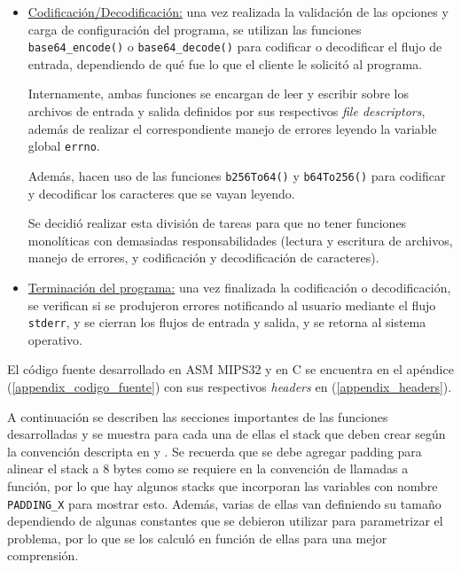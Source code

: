 \begin{itemize}
	\item \underline{Codificación/Decodificación:} una vez realizada la validación de las opciones y carga de configuración del programa, se utilizan las funciones \texttt{base64\_encode()} o \texttt{base64\_decode()} para codificar o decodificar el flujo de entrada, dependiendo de qué fue lo que el cliente le solicitó al programa.
	
	Internamente, ambas funciones se encargan de leer y escribir sobre los archivos de entrada y salida definidos por sus respectivos \emph{file descriptors}, además de realizar el correspondiente manejo de errores leyendo la variable global \texttt{errno}.
	
	Además, hacen uso de las funciones \texttt{b256To64()} y \texttt{b64To256()} para codificar y decodificar los caracteres que se vayan leyendo.
	
	Se decidió realizar esta división de tareas para que no tener funciones monolíticas con demasiadas responsabilidades (lectura y escritura de archivos, manejo de errores, y codificación y decodificación de caracteres).
	
	\item \underline{Terminación del programa:} una vez finalizada la codificación o decodificación, se verifican si se produjeron errores notificando al usuario mediante el flujo \texttt{stderr}, y se cierran los flujos de entrada y salida, y se retorna al sistema operativo.
\end{itemize}

El código fuente desarrollado en ASM MIPS32 y en C se encuentra en el apéndice (\ref{appendix_codigo_fuente}) con sus respectivos \emph{headers} en (\ref{appendix_headers}).

A continuación se describen las secciones importantes de las funciones desarrolladas y se muestra para cada una de ellas el stack que deben crear según la convención descripta en \cite{abi} y \cite{abi_curso}. Se recuerda que se debe agregar padding para alinear el stack a 8 bytes como se requiere en la convención de llamadas a función, por lo que hay algunos stacks que incorporan las variables con nombre \texttt{PADDING\_X} para mostrar esto. Además, varias de ellas van definiendo su tamaño dependiendo de algunas constantes que se debieron utilizar para parametrizar el problema, por lo que se los calculó en función de ellas para una mejor comprensión.

